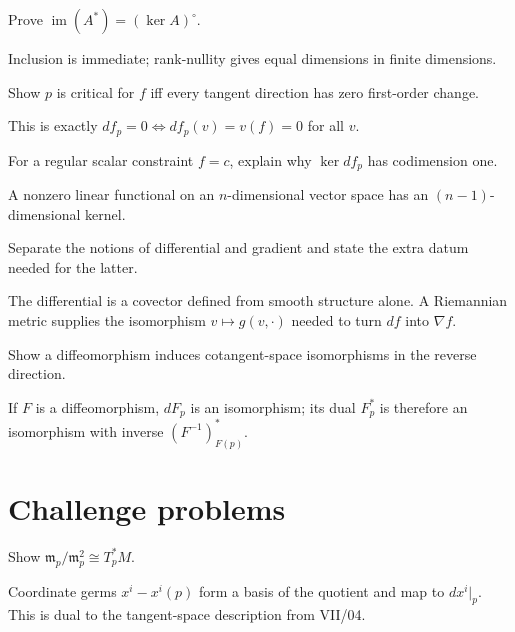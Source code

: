 \begin{problem}\label{prob:vii05-08}
Prove \(\operatorname{im}(A^*)=(\ker A)^\circ\).
\end{problem}
\begin{solution}
Inclusion is immediate; rank-nullity gives equal dimensions in finite dimensions.
\end{solution}

\begin{problem}\label{prob:vii05-09}
Show \(p\) is critical for \(f\) iff every tangent direction has zero first-order change.
\end{problem}
\begin{solution}
This is exactly \(df_p=0\iff df_p(v)=v(f)=0\) for all \(v\).
\end{solution}

\begin{problem}\label{prob:vii05-10}
For a regular scalar constraint \(f=c\), explain why \(\ker df_p\) has codimension one.
\end{problem}
\begin{solution}
A nonzero linear functional on an \(n\)-dimensional vector space has an \((n-1)\)-dimensional kernel.
\end{solution}

\begin{problem}\label{prob:vii05-11}
Separate the notions of differential and gradient and state the extra datum needed for the latter.
\end{problem}
\begin{solution}
The differential is a covector defined from smooth structure alone. A Riemannian metric supplies the isomorphism \(v\mapsto g(v,\cdot)\) needed to turn \(df\) into \(\nabla f\).
\end{solution}

\begin{problem}\label{prob:vii05-12}
Show a diffeomorphism induces cotangent-space isomorphisms in the reverse direction.
\end{problem}
\begin{solution}
If \(F\) is a diffeomorphism, \(dF_p\) is an isomorphism; its dual \(F_p^*\) is therefore an isomorphism with inverse \((F^{-1})_{F(p)}^*\).
\end{solution}

\section{Challenge problems}
\begin{problem}\label{prob:vii05-ch01}
Show \(\mathfrak m_p/\mathfrak m_p^2\cong T_p^*M\).
\end{problem}
\begin{solution}
Coordinate germs \(x^i-x^i(p)\) form a basis of the quotient and map to \(dx^i|_p\). This is dual to the tangent-space description from VII/04.
\end{solution}

